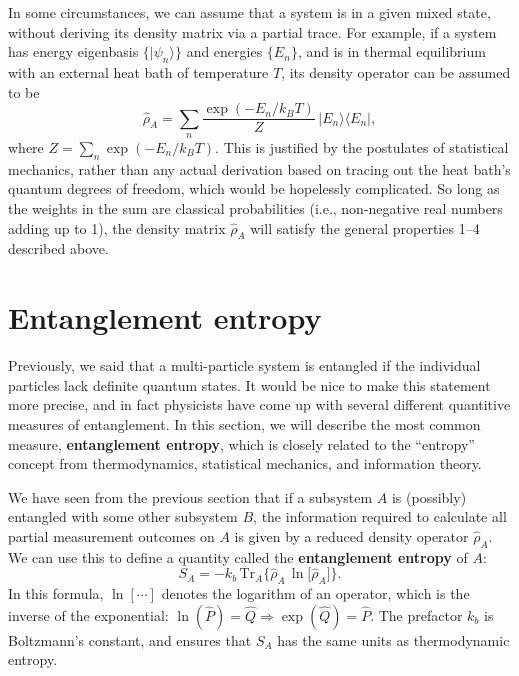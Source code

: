 \documentclass[pra,12pt]{revtex4-2}
\begin{document}
In some circumstances, we can assume that a system is in a given mixed
state, without deriving its density matrix via a partial trace.  For
example, if a system has energy eigenbasis $\{|\psi_n\rangle\}$ and
energies $\{E_n\}$, and is in thermal equilibrium with an external
heat bath of temperature $T$, its density operator can be assumed to
be
\begin{equation}
  \hat{\rho}_A = \sum_{n} \frac{\exp(-E_n/k_BT)}{Z} \, |E_n\rangle\langle E_n|,
\end{equation}
where $Z = \sum_n \exp(-E_n/k_BT)$.  This is justified by the
postulates of statistical mechanics, rather than any actual derivation
based on tracing out the heat bath's quantum degrees of freedom, which
would be hopelessly complicated.  So long as the weights in the sum
are classical probabilities (i.e., non-negative real numbers adding up
to 1), the density matrix $\hat{\rho}_A$ will satisfy the general
properties 1--4 described above.

\section{Entanglement entropy}
\label{sec:entropy}

Previously, we said that a multi-particle system is entangled if the
individual particles lack definite quantum states.  It would be nice
to make this statement more precise, and in fact physicists have come
up with several different quantitive measures of entanglement.  In
this section, we will describe the most common measure,
\textbf{entanglement entropy}, which is closely related to the
``entropy'' concept from thermodynamics, statistical mechanics, and
information theory.

We have seen from the previous section that if a subsystem $A$ is
(possibly) entangled with some other subsystem $B$, the information
required to calculate all partial measurement outcomes on $A$ is given
by a reduced density operator $\hat{\rho}_A$.  We can use this to
define a quantity called the \textbf{entanglement entropy} of $A$:
\begin{equation}
  S_{A} = - k_b \, \mathrm{Tr}_A \Big\{ \hat{\rho}_A\, \ln\!\big[\hat{\rho}_A\big]\Big\}.
  \label{entropy}
\end{equation}
In this formula, $\ln[\cdots]$ denotes the logarithm of an operator,
which is the inverse of the exponential: $\ln(\hat{P}) = \hat{Q}
\Rightarrow \exp(\hat{Q}) = \hat{P}$.  The prefactor $k_b$ is
Boltzmann's constant, and ensures that $S_A$ has the same units as
thermodynamic entropy.
\end{document}

